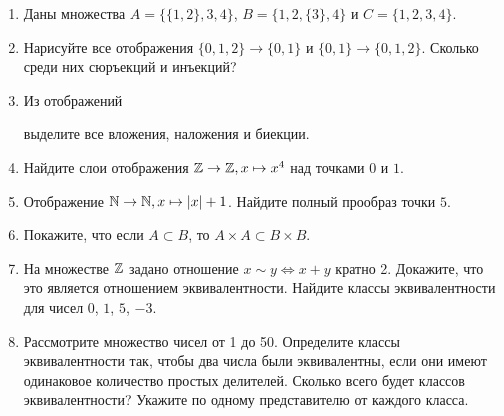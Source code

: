 \begin{enumerate}
    \item Даны множества $A = \{\{1, 2 \}, 3, 4 \}$, $B = \{1, 2, \{3 \}, 4\}$ и $C = \{1, 2, 3, 4\}.$ 
    \item Нарисуйте все отображения $\{0, 1, 2\} \to \{0, 1\}$ и $\{0, 1\} \to \{0, 1, 2\}$. Сколько среди них сюръекций и инъекций?
    \item Из отображений  выделите все вложения, наложения и биекции.
    \item Найдите слои отображения $\mathbb Z \to \mathbb Z, x \mapsto x^4$ над точками $0$ и $1$.
    \item Отображение $\mathbb N \to \mathbb N, x \mapsto |x| + 1$. Найдите полный прообраз точки $5$.  
    \item Покажите, что если $A \subset B$, то $A \times A \subset B \times B$. 
    \item На множестве $\mathbb Z$ задано отношение $x \sim y \iff x + y$ кратно 2. Докажите, что это является отношением эквивалентности. Найдите классы эквивалентности для чисел $0$, $1$, $5$, $-3$.
    \item Рассмотрите множество чисел от 1 до 50. Определите классы эквивалентности так, чтобы два числа были эквивалентны, если они имеют одинаковое количество простых делителей. Сколько всего будет классов эквивалентности? Укажите по одному представителю от каждого класса. 

\end{enumerate}
